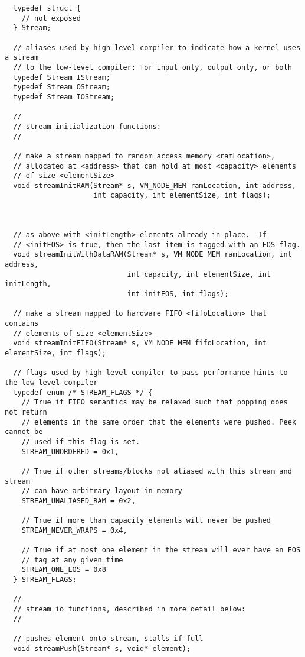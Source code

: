 {\small
\begin{verbatim}
  typedef struct {
    // not exposed
  } Stream;

  // aliases used by high-level compiler to indicate how a kernel uses a stream
  // to the low-level compiler: for input only, output only, or both
  typedef Stream IStream;
  typedef Stream OStream;
  typedef Stream IOStream;
 
  //
  // stream initialization functions:
  //
  
  // make a stream mapped to random access memory <ramLocation>, 
  // allocated at <address> that can hold at most <capacity> elements
  // of size <elementSize>
  void streamInitRAM(Stream* s, VM_NODE_MEM ramLocation, int address, 
                     int capacity, int elementSize, int flags); 
 


  // as above with <initLength> elements already in place.  If 
  // <initEOS> is true, then the last item is tagged with an EOS flag.
  void streamInitWithDataRAM(Stream* s, VM_NODE_MEM ramLocation, int address, 
                             int capacity, int elementSize, int initLength, 
                             int initEOS, int flags);

  // make a stream mapped to hardware FIFO <fifoLocation> that contains
  // elements of size <elementSize>
  void streamInitFIFO(Stream* s, VM_NODE_MEM fifoLocation, int elementSize, int flags);

  // flags used by high level-compiler to pass performance hints to the low-level compiler
  typedef enum /* STREAM_FLAGS */ {
    // True if FIFO semantics may be relaxed such that popping does not return   
    // elements in the same order that the elements were pushed. Peek cannot be
    // used if this flag is set.
    STREAM_UNORDERED = 0x1,

    // True if other streams/blocks not aliased with this stream and stream 
    // can have arbitrary layout in memory
    STREAM_UNALIASED_RAM = 0x2,
    
    // True if more than capacity elements will never be pushed
    STREAM_NEVER_WRAPS = 0x4,

    // True if at most one element in the stream will ever have an EOS
    // tag at any given time
    STREAM_ONE_EOS = 0x8
  } STREAM_FLAGS;  

  //
  // stream io functions, described in more detail below:
  //
  
  // pushes element onto stream, stalls if full
  void streamPush(Stream* s, void* element);
  

\end{verbatim}}
